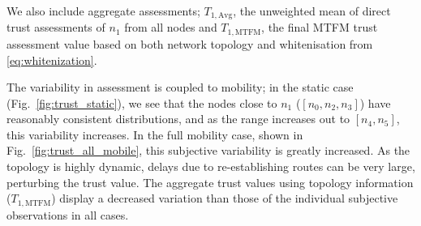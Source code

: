 \documentclass[conference]{IEEEtran}
\begin{document}
We also include aggregate assessments; $T_{1,\text{Avg}}$, the unweighted mean of direct trust assessments of $n_1$ from all nodes and $T_{1,\text{MTFM}}$, the final MTFM trust assessment value based on both network topology and whitenisation from \eqref{eq:whitenization}.

The variability in assessment is coupled to mobility; in the static case (Fig.~\ref{fig:trust_static}), we see that the nodes close to $n_1$ ($[n_0,n_2,n_3]$) have reasonably consistent distributions, and as the range increases out to $[n_4,n_5]$, this variability increases.
In the full mobility case, shown in Fig.~\ref{fig:trust_all_mobile}, this subjective variability is greatly increased. 
As the topology is highly dynamic, delays due to re-establishing routes can be very large, perturbing the trust value.
The aggregate trust values using topology information ($T_{1,\text{MTFM}}$) display a decreased variation than those of the individual subjective observations in all cases.
\end{document}
